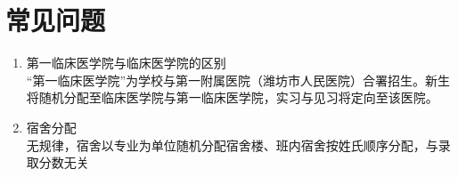 \section[常见问题]{常见问题}
\begin{enumerate}
    \item 第一临床医学院与临床医学院的区别\\
          “第一临床医学院”为学校与第一附属医院（潍坊市人民医院）合署招生。新生将随机分配至临床医学院与第一临床医学院，实习与见习将定向至该医院。
    \item 宿舍分配\label{random_allocation}\\
          无规律，宿舍以专业为单位随机分配宿舍楼、班内宿舍按姓氏顺序分配，与录取分数无关
\end{enumerate}


